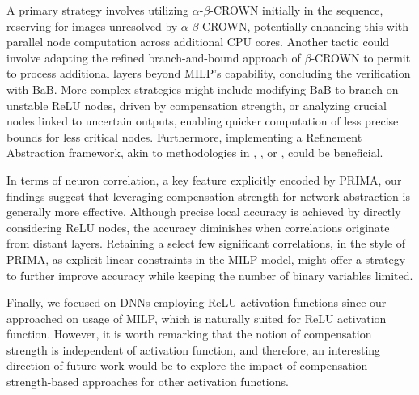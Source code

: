 A primary strategy involves utilizing $\alpha$-$\beta$-CROWN initially in the sequence, reserving {\toolname} for images unresolved by $\alpha$-$\beta$-CROWN, potentially enhancing this with parallel node computation across additional CPU cores. Another tactic could involve adapting the refined branch-and-bound approach of $\beta$-CROWN to permit {\toolname} to process additional layers beyond MILP's capability, concluding the verification with BaB. More complex strategies might include modifying BaB to branch on unstable ReLU nodes, driven by compensation strength, or analyzing crucial nodes linked to uncertain outputs, enabling quicker computation of less precise bounds for less critical nodes. Furthermore, implementing a Refinement Abstraction framework, akin to methodologies in \cite{atva}, \cite{elboher}, or \cite{SRGR}, could be beneficial.

In terms of neuron correlation, a key feature explicitly encoded by PRIMA, our findings suggest that leveraging compensation strength for network abstraction is generally more effective. Although precise local accuracy is achieved by directly considering ReLU nodes, the accuracy diminishes when correlations originate from distant layers. Retaining a select few significant correlations, in the style of PRIMA, as explicit linear constraints in the MILP model, might offer a strategy to further improve accuracy while keeping the number of binary variables limited. 

Finally, we focused on DNNs employing ReLU activation functions since our approached on usage of MILP, which is naturally suited for ReLU activation function. However, it is worth remarking that the notion of compensation strength is independent of activation function, and therefore, an interesting direction of future work would be to explore the impact of compensation strength-based approaches for other activation functions. 
